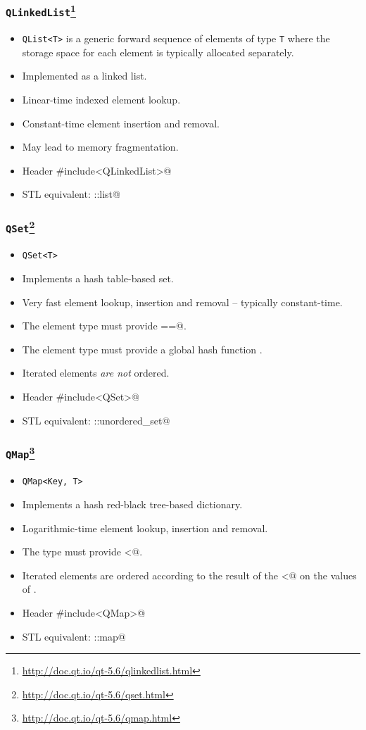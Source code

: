 \begin{frame}[fragile]
  \frametitle{\texttt{QLinkedList}\footnote
    {\url{http://doc.qt.io/qt-5.6/qlinkedlist.html}}}
  \begin{itemize}
    \item \texttt{QList<T>} is a generic forward sequence of elements of
    type \texttt{T} where the storage space for each element is typically
    allocated separately.
    \item Implemented as a linked list.
    \item Linear-time indexed element lookup.
    \item Constant-time element insertion and removal.
    \item May lead to memory fragmentation.
    \item Header \verb@#include<QLinkedList>@
    \item STL equivalent: \verb@std::list@
  \end{itemize}
\end{frame}

\begin{frame}[fragile]
  \frametitle{\texttt{QSet}\footnote
    {\url{http://doc.qt.io/qt-5.6/qset.html}}}
  \begin{itemize}
    \item \texttt{QSet<T>}
    \item Implements a hash table-based set.
    \item Very fast element lookup, insertion and removal -- typically
      constant-time.
    \item The element type must provide \verb@operator ==@.
    \item The element type must provide a global hash function \verb@qHash@.
    \item Iterated elements {\em are not} ordered.
    \item Header \verb@#include<QSet>@
    \item STL equivalent: \verb@std::unordered_set@
  \end{itemize}
\end{frame}

\begin{frame}[fragile]
  \frametitle{\texttt{QMap}\footnote
    {\url{http://doc.qt.io/qt-5.6/qmap.html}}}
  \begin{itemize}
    \item \texttt{QMap<Key, T>}
    \item Implements a hash red-black tree-based dictionary.
    \item Logarithmic-time element lookup, insertion and removal.
    \item The \verb@Key@ type must provide \verb@operator <@.
    \item Iterated elements are ordered according to the result of the
    \verb@operator <@ on the values of \verb@Key@.
    \item Header \verb@#include<QMap>@
    \item STL equivalent: \verb@std::map@
  \end{itemize}
\end{frame}

